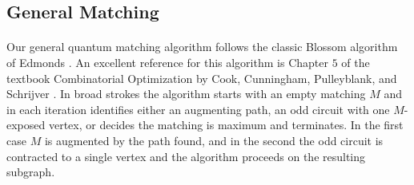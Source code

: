 \subsection{General Matching}
\paragraph{}
Our general quantum matching algorithm follows the classic Blossom algorithm of Edmonds \cite{edmonds1965paths}. An excellent reference for this algorithm is Chapter $5$ of the textbook Combinatorial Optimization by Cook, Cunningham, Pulleyblank, and Schrijver \cite{cook2009combinatorial}. In broad strokes the algorithm starts with an empty matching $M$ and in each iteration identifies either an augmenting path, an odd circuit with one $M$-exposed vertex, or decides the matching is maximum and terminates. In the first case $M$ is augmented by the path found, and in the second the odd circuit is contracted to a single vertex and the algorithm proceeds on the resulting subgraph.
